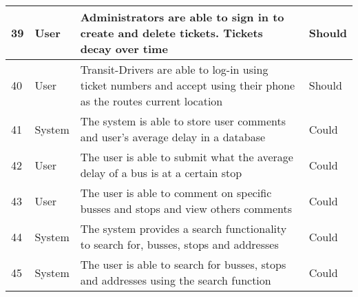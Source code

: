 \documentclass[a4paper,12pt]{article}
\begin{document}
\begin{tabular}{p{0.4cm}|p{2cm}|p{8cm}|p{1.7cm}}

39 & User & Administrators are able to sign in to create and delete tickets. Tickets decay over time & Should \\
\hline
40 & User & Transit-Drivers are able to log-in using ticket numbers and accept using their phone as the routes current location & Should \\
\hline
41 & System & The system is able to store user comments and user's average delay in a database & Could \\
\hline
42 & User & The user is able to submit what the average delay of a bus is at a certain stop & Could \\
\hline
43 & User & The user is able to comment on specific busses and stops and view others comments & Could \\
\hline
44 & System & The system provides a search functionality to search for, busses, stops and addresses & Could \\
\hline
45 & System & The user is able to search for busses, stops and addresses using the search function & Could \\
\hline
\end{tabular}
\end{document}
